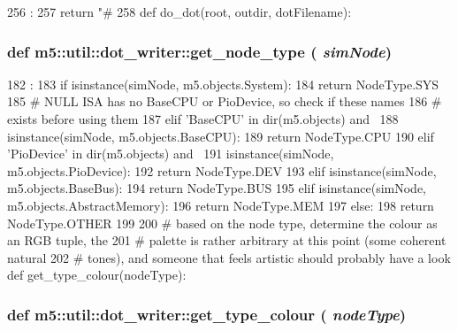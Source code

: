 \begin{DoxyCode}
256                             :
257     return "#%
258 
def do_dot(root, outdir, dotFilename):
\end{DoxyCode}
\hypertarget{namespacem5_1_1util_1_1dot__writer_a498b4029e58b118de7ca1b994d70234c}{
\subsubsection[{get\_\-node\_\-type}]{\setlength{\rightskip}{0pt plus 5cm}def m5::util::dot\_\-writer::get\_\-node\_\-type ( {\em simNode})}}
\label{namespacem5_1_1util_1_1dot__writer_a498b4029e58b118de7ca1b994d70234c}



\begin{DoxyCode}
182                           :
183     if isinstance(simNode, m5.objects.System):
184         return NodeType.SYS
185     # NULL ISA has no BaseCPU or PioDevice, so check if these names
186     # exists before using them
187     elif 'BaseCPU' in dir(m5.objects) and \
188             isinstance(simNode, m5.objects.BaseCPU):
189         return NodeType.CPU
190     elif 'PioDevice' in dir(m5.objects) and \
191             isinstance(simNode, m5.objects.PioDevice):
192         return NodeType.DEV
193     elif isinstance(simNode, m5.objects.BaseBus):
194         return NodeType.BUS
195     elif isinstance(simNode, m5.objects.AbstractMemory):
196         return NodeType.MEM
197     else:
198         return NodeType.OTHER
199 
200 # based on the node type, determine the colour as an RGB tuple, the
201 # palette is rather arbitrary at this point (some coherent natural
202 # tones), and someone that feels artistic should probably have a look
def get_type_colour(nodeType):
\end{DoxyCode}
\hypertarget{namespacem5_1_1util_1_1dot__writer_a7bba31405ed25bdf7a33744c7e90b502}{
\subsubsection[{get\_\-type\_\-colour}]{\setlength{\rightskip}{0pt plus 5cm}def m5::util::dot\_\-writer::get\_\-type\_\-colour ( {\em nodeType})}}
\label{namespacem5_1_1util_1_1dot__writer_a7bba31405ed25bdf7a33744c7e90b502}



